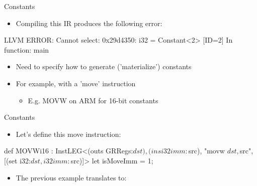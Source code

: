 
\begin{frame}[fragile]{Constants}

\begin{itemize}
    \item Compiling this IR produces the following error:
\end{itemize}

\begin{codebox}
\end{codebox}

\begin{codebox}
LLVM ERROR: Cannot select: 0x29d4350: i32 = Constant<2> [ID=2]
In function: main
\end{codebox}

\begin{itemize}
    \item Need to specify how to generate ('materialize') constants
    \item For example, with a 'move' instruction
    \begin{itemize}
        \item E.g. MOVW on ARM for 16-bit constants
    \end{itemize}
\end{itemize}

\end{frame}


\begin{frame}[fragile]{Constants}

\begin{itemize}
    \item Let's define this move instruction:
\end{itemize}

\begin{codebox}
def MOVWi16 : InstLEG<(outs GRRegs:$dst),
                      (ins i32imm:$src),
                      "movw $dst, $src",
                      [(set i32:$dst, i32imm:$src)]> {
  let isMoveImm = 1;
}
\end{codebox}

\begin{itemize}
    \item The previous example translates to:
\end{itemize}


\end{frame}

